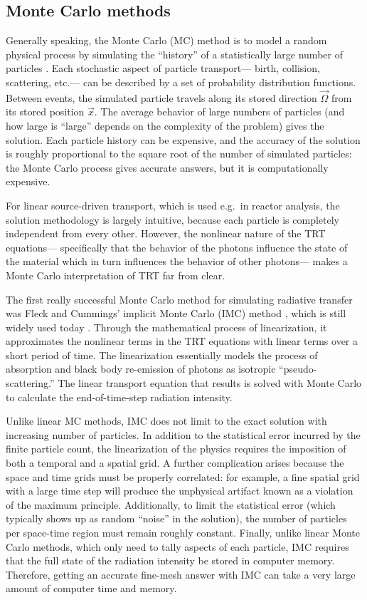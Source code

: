 \subsection{Monte Carlo methods}

Generally speaking, the Monte Carlo (MC) method is to model a random
physical process by simulating the ``history'' of a statistically large number
of particles \cite{Bro2004a}. Each stochastic aspect of particle transport---%
birth, collision, scattering, etc.---%
can be described by a set of probability distribution functions. Between
events, the simulated particle travels along its stored direction
$\vec{\Omega}$ from its stored position $\vec{x}$. The average behavior of
large numbers of particles (and how large is ``large'' depends on the
complexity of the problem) gives the solution. Each particle history can be
expensive, and the accuracy of the solution is roughly proportional to the
square root of the number of simulated particles: the Monte Carlo process
gives accurate answers, but it is computationally expensive. 

For linear source-driven transport, which is used e.g.~in reactor analysis, the
solution
methodology is largely intuitive, because each particle is
completely independent from every other. However, the nonlinear nature of the
TRT equations---%
specifically that the behavior of the photons influence the state of the
material which in turn influences the behavior of other photons---%
makes a Monte Carlo interpretation of TRT far from clear.

The first really successful Monte Carlo method for simulating radiative
transfer was Fleck and Cummings' implicit Monte Carlo (IMC) method
\cite{Fle1971,Wol2008}, which is still widely used today \cite{Urb2006}.
Through the
mathematical process of linearization, it approximates the nonlinear terms in
the TRT equations with linear terms over a short period of time. The
linearization essentially models the process of absorption and
black body re-emission of photons as isotropic ``pseudo-scattering.'' The linear
transport equation that results is solved with Monte Carlo to calculate the
end-of-time-step radiation intensity.

Unlike linear MC methods, IMC does not limit to the exact solution with
increasing number of particles. In addition to the statistical error incurred
by the finite particle count, the linearization of the physics requires
the imposition of both a temporal and a spatial grid. A further complication 
arises because the space and time grids must be properly correlated: for
example, a fine spatial grid with a large time step will produce the unphysical
artifact known as a violation of the maximum principle.
Additionally, to limit the statistical error (which typically shows up as
random ``noise'' in the solution), the number of particles per
space-time region must remain roughly constant. Finally, unlike linear Monte
Carlo methods, which only need to tally aspects of each particle, IMC requires
that the full state of the radiation intensity be stored in computer memory.
Therefore, getting an accurate fine-mesh answer with IMC can take a very large
amount of computer time and memory.

